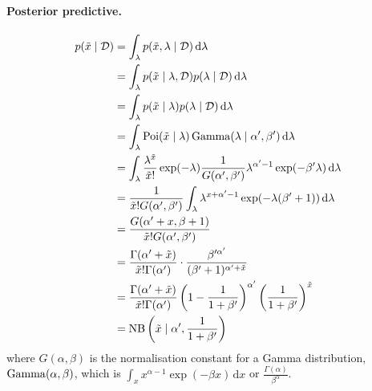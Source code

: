 \paragraph{Posterior predictive.}
    \begin{align*}
        p(\tilde x \mid \mathcal D) &= \int_{\lambda} p(\tilde x, \lambda \mid \mathcal D) \,\mathrm d\lambda \\
                                    &= \int_{\lambda} p(\tilde x \mid \lambda, \mathcal D) p(\lambda \mid \mathcal D) \,\mathrm d\lambda \\
                                    &= \int_{\lambda} p(\tilde x \mid \lambda) p(\lambda \mid \mathcal D) \,\mathrm d\lambda \\
                                    &= \int_{\lambda} \operatorname{Poi}(\tilde x \mid \lambda) \operatorname{Gamma}(\lambda \mid \alpha', \beta') \,\mathrm d\lambda \\
                                    &= \int_{\lambda} \frac{\lambda^{\tilde x}}{\tilde x!} \exp(-\lambda) \frac{1}{G(\alpha', \beta')} \lambda^{\alpha' - 1} \exp(-\beta' \lambda) \,\mathrm d\lambda \\
                                    &= \frac{1}{\tilde x! G(\alpha', \beta')} \int_{\lambda} \lambda^{x + \alpha' - 1} \exp(-\lambda (\beta' + 1)) \,\mathrm d\lambda \\
                                    &= \frac{G(\alpha' + x, \beta + 1)}{\tilde x! G(\alpha', \beta')} \\
                                    &= \frac{\Gamma(\alpha' + \tilde x)}{\tilde x! \Gamma(\alpha')} \cdot \frac{\beta'^{\alpha'}}{(\beta' + 1)^{\alpha' + \tilde x}} \\
                                    &= \frac{\Gamma(\alpha' + \tilde x)}{\tilde x! \Gamma(\alpha')} \left(1 - \frac{1}{1 + \beta'}\right)^{\alpha'} \left(\frac{1}{1 + \beta'}\right)^{\tilde x} \\
                                    &= \operatorname{NB}\left(\tilde x \mid \alpha', \frac{1}{1 + \beta'}\right)
    \end{align*}
where $G(\alpha, \beta)$ is the normalisation constant for a Gamma distribution, $\operatorname{Gamma}(\alpha, \beta)$, which is $\int_x x^{\alpha - 1} \exp(-\beta x) \,\mathrm dx$ or $\frac{\Gamma(\alpha)}{\beta^\alpha}$.
